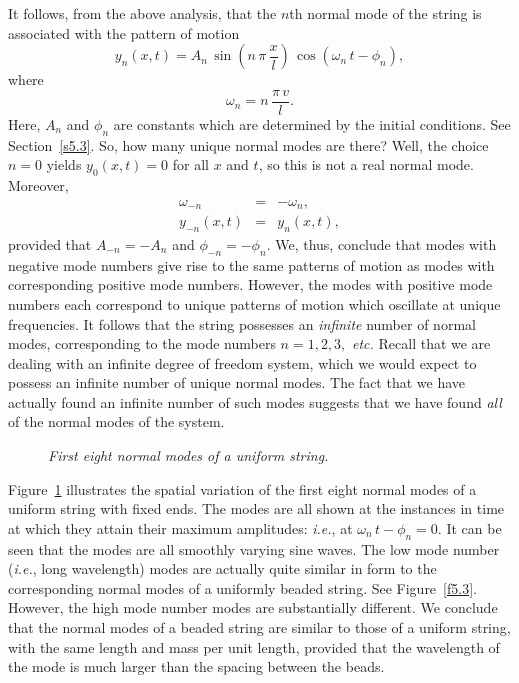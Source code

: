 It follows, from the above analysis, that the $n$th normal mode of the string
is associated with the pattern of motion
\begin{equation}\label{e5.34}
y_n(x,t) = A_n\,\sin\left(n\,\pi\,\frac{x}{l}\right)\,\cos(\omega_n\,t-\phi_n),
\end{equation}
where
\begin{equation}\label{e5.35}
\omega_n = n\,\frac{\pi\,v}{l}.
\end{equation}
Here, $A_n$ and $\phi_n$ are constants which are determined
by the initial conditions. See Section~\ref{s5.3}. So, how many unique normal modes are there? Well,
the choice $n=0$ yields $y_0(x,t)=0$ for all $x$ and $t$, so this is not a real normal mode. Moreover,
\begin{eqnarray}
\omega_{-n}&=&-\omega_n,\\[0.5ex]
y_{-n}(x,t) &=& y_n(x,t),
\end{eqnarray}
provided that $A_{-n}= - A_n$ and $\phi_{-n}=-\phi_n$. We, thus,  conclude that
modes with negative mode numbers give rise to the same patterns of motion
as modes with corresponding positive mode numbers. However, the modes with
positive mode numbers each correspond to unique patterns of motion which
oscillate at unique frequencies. It follows that the string possesses an {\em infinite}\/ number
of normal modes, corresponding to the mode numbers $n=1,2,3,$ {\em etc.}
Recall that we are dealing with an infinite degree of freedom system, which
we would  expect to possess an infinite number of  unique normal modes. The fact that
we have actually found an infinite number of such modes suggests that we have found {\em all}\/
of the normal modes of the system. 

\begin{figure}
\epsfysize=7in
\centerline{}
\caption{\em First eight normal modes of a uniform string.}\label{f5.6}   
\end{figure}

Figure~\ref{f5.6} illustrates the  spatial variation of the first eight normal modes of 
a uniform string with fixed ends. The modes are all
shown at the instances in time at which they attain their maximum amplitudes: {\em i.e.},
at $\omega_n\,t-\phi_n=0$. It can be seen that  the modes are all smoothly
varying sine waves. The low mode number ({\em i.e.}, long wavelength) modes are actually quite similar in form
to the corresponding normal modes of a uniformly beaded string. See Figure~\ref{f5.3}.
However, the high mode number modes are substantially different.
We conclude that the normal modes of a beaded string are similar to those of
a uniform string, with the same length and mass per unit length, provided that the wavelength of the mode is much larger
than the spacing between the beads. 


